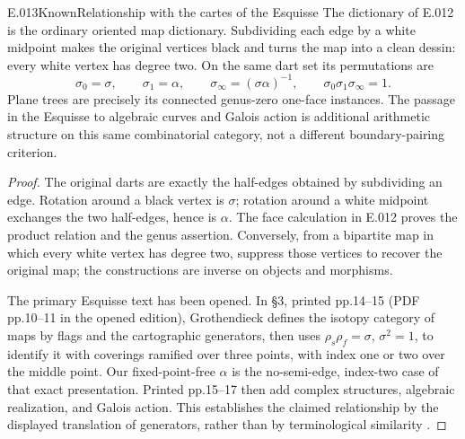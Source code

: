 \begin{saresult}{E.013}{Known}{Relationship with the cartes of the Esquisse}
The dictionary of E.012 is the ordinary oriented map dictionary. Subdividing
each edge by a white midpoint makes the original vertices black and
turns the map into a clean dessin: every white vertex has degree two.
On the same dart set its permutations are
\[
 \sigma_0=\sigma,\qquad\sigma_1=\alpha,
 \qquad\sigma_\infty=(\sigma\alpha)^{-1},
 \qquad\sigma_0\sigma_1\sigma_\infty=1.
\]
Plane trees are precisely its connected genus-zero one-face instances.
The passage in the Esquisse to algebraic curves and Galois action is
additional arithmetic structure on this same combinatorial category,
not a different boundary-pairing criterion.
\end{saresult}
\begin{proof}
The original darts are exactly the half-edges obtained by subdividing
an edge. Rotation around a black vertex is $\sigma$; rotation around
a white midpoint exchanges the two half-edges, hence is $\alpha$.
The face calculation in E.012 proves the product relation and the genus
assertion. Conversely, from a bipartite map in which every white vertex
has degree two, suppress those vertices to recover the original map;
the constructions are inverse on objects and morphisms.

The primary Esquisse text has been opened. In \S3, printed pp.14--15
(PDF pp.10--11 in the opened edition), Grothendieck defines the isotopy
category of maps by flags and the cartographic generators, then uses
$\rho_s\rho_f=\sigma$, $\sigma^2=1$, to identify it with coverings
ramified over three points, with index one or two over the middle point.
Our fixed-point-free $\alpha$ is the no-semi-edge, index-two case of
that exact presentation. Printed pp.15--17 then add complex structures,
algebraic realization, and Galois action. This establishes the claimed
relationship by the displayed translation of generators, rather than by
terminological similarity \cite[\S3, pp.14--17]{GrothendieckEsquisse}.
\end{proof}


